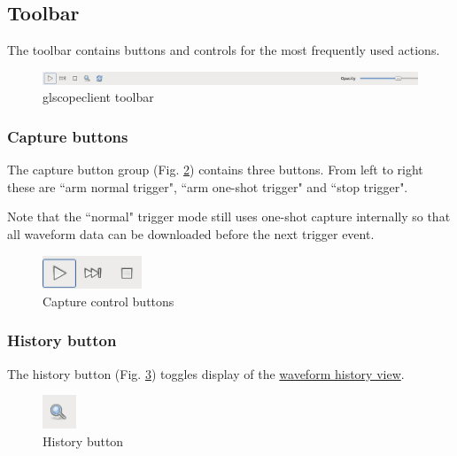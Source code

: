 \documentclass[11pt]{article}
\begin{document}
\subsection{Toolbar}

The toolbar contains buttons and controls for the most frequently used actions.

\begin{figure}[h]
\centering
\includegraphics[width=16cm]{images/toolbar.png}
\caption{glscopeclient toolbar}
\label{toolbar}
\end{figure}

\subsubsection{Capture buttons}

The capture button group (Fig. \ref{capturebuttons}) contains three buttons. From left to right these are ``arm
normal trigger", ``arm one-shot trigger" and ``stop trigger".

Note that the ``normal" trigger mode still uses one-shot capture internally so that all waveform data can be downloaded
before the next trigger event.

\begin{figure}[h]
\centering
\includegraphics[height=1cm]{images/capture-icons.png}
\caption{Capture control buttons}
\label{capturebuttons}
\end{figure}

\subsubsection{History button}

The history button (Fig. \ref{historybutton}) toggles display of the \hyperref[sec:history]{waveform history view}.

\begin{figure}[h]
\centering
\includegraphics[height=1cm]{images/history-button.png}
\caption{History button}
\label{historybutton}
\end{figure}
\end{document}
